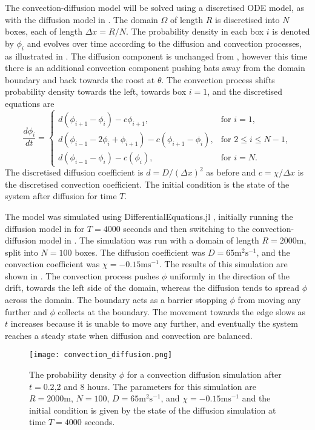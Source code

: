 The convection-diffusion model will be solved using a discretised ODE model, as with the diffusion model in . The domain $\Omega$ of length $R$ is discretised into $N$ boxes, each of length $\Delta x = R/N$. The probability density in each box $i$ is denoted by $\phi_i$ and evolves over time according to the diffusion and convection processes, as illustrated in . The diffusion component is unchanged from , however this time there is an additional convection component pushing bats away from the domain boundary and back towards the roost at $\theta$. The convection process shifts probability density towards the left, towards box $i = 1$, and the discretised equations are
%
\begin{equation}
\frac{d\phi_i}{dt} = \begin{cases}
		d(\phi_{i+1} - \phi_i) - c \phi_{i+1}, & \text{for } i = 1, \\
		d(\phi_{i-1}-2\phi_i +\phi_{i+1}) - c(\phi_{i+1}-\phi_{i}), & \text{for } 2 \leq i \leq N-1, \\
		d(\phi_{i-1}-\phi_i) - c(\phi_{i}), & \text{for } i = N.
		\end{cases}
        \label{eqn:discrete_convection}
\end{equation}
%
The discretised diffusion coefficient is $d = D/(\Delta x)^2$ as before and $c=\chi/\Delta x$ is the discretised convection coefficient. The initial condition is the state of the system after diffusion for time $T$.

The model was simulated using DifferentialEquations.jl \cite{DifferentialEquations}, initially running the
diffusion model in  for $T = 4000$ seconds and
then switching to the convection-diffusion model in . The
simulation was run with a domain of length $R = 2000$m, split into $N = 100$
boxes. The diffusion coefficient was $D = 65\mathrm{m^2s^{-1}}$, and the convection coefficient
was $\chi =  - 0.15\mathrm{ms^{-1}}$. The results
of this simulation are shown in . The convection process pushes $\phi$ uniformly in the direction of the drift, towards the left side of the domain, whereas the diffusion tends to spread $\phi$ across the domain. The boundary acts as a barrier stopping $\phi$ from moving any further and $\phi$ collects at the boundary. The movement towards the edge slows as $t$ increases because it is unable to move any further, and eventually the system reaches a steady state when diffusion and convection are balanced.

  \begin{figure} [t]
      \centering
          \texttt{[image: convection\_diffusion.png]}
          \caption{The probability density $\phi$ for a convection diffusion simulation after $t = 0.2$,2 and 8 hours. The parameters for this simulation are $R = 2000$m, $N = 100$,
          $D = 65\mathrm{m^2s^{-1}}$, and $\chi = - 0.15\mathrm{ms^{-1}}$ and the initial condition is given by the state of the diffusion simulation at time $T = 4000$ seconds.}
      \label{fig:convection_diffusion}
  \end{figure}
